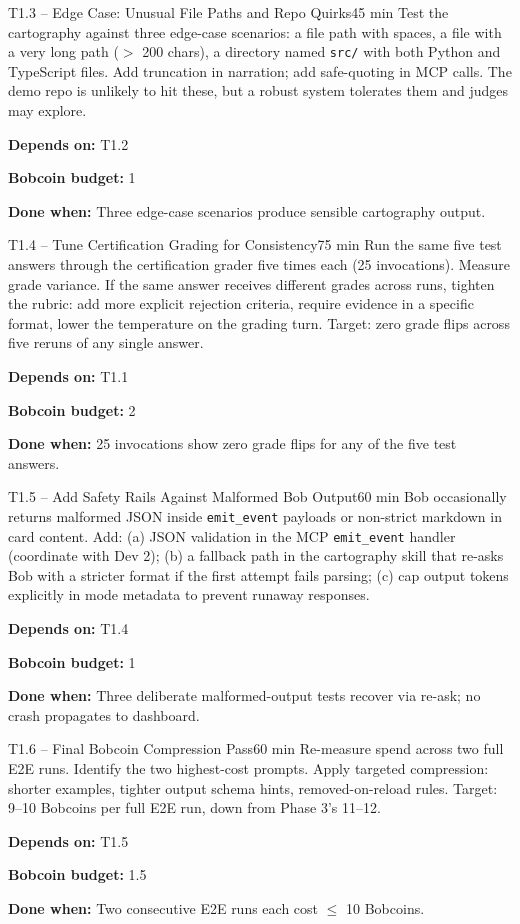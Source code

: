 \documentclass[11pt,letterpaper]{article}
\newcommand{\acceptance}[1]{\par\smallskip\textcolor{ibmgreen}{\textbf{Done when:}} #1}
\newcommand{\depends}[1]{\par\smallskip\textcolor{ibmorange}{\textbf{Depends on:}} #1}
\newcommand{\bobcost}[1]{\par\smallskip\textcolor{ibmaccent}{\textbf{Bobcoin budget:}} #1}
\begin{document}
\begin{task}{T1.3 -- Edge Case: Unusual File Paths and Repo Quirks}{45 min}
Test the cartography against three edge-case scenarios: a file path with spaces, a file with a very long path ($>$ 200 chars), a directory named \texttt{src/} with both Python and TypeScript files. Add truncation in narration; add safe-quoting in MCP calls. The demo repo is unlikely to hit these, but a robust system tolerates them and judges may explore.
\depends{T1.2}
\bobcost{1}
\acceptance{Three edge-case scenarios produce sensible cartography output.}
\end{task}

\begin{task}{T1.4 -- Tune Certification Grading for Consistency}{75 min}
Run the same five test answers through the certification grader five times each (25 invocations). Measure grade variance. If the same answer receives different grades across runs, tighten the rubric: add more explicit rejection criteria, require evidence in a specific format, lower the temperature on the grading turn. Target: zero grade flips across five reruns of any single answer.
\depends{T1.1}
\bobcost{2}
\acceptance{25 invocations show zero grade flips for any of the five test answers.}
\end{task}

\begin{task}{T1.5 -- Add Safety Rails Against Malformed Bob Output}{60 min}
Bob occasionally returns malformed JSON inside \texttt{emit\_event} payloads or non-strict markdown in card content. Add: (a) JSON validation in the MCP \texttt{emit\_event} handler (coordinate with Dev 2); (b) a fallback path in the cartography skill that re-asks Bob with a stricter format if the first attempt fails parsing; (c) cap output tokens explicitly in mode metadata to prevent runaway responses.
\depends{T1.4}
\bobcost{1}
\acceptance{Three deliberate malformed-output tests recover via re-ask; no crash propagates to dashboard.}
\end{task}

\begin{task}{T1.6 -- Final Bobcoin Compression Pass}{60 min}
Re-measure spend across two full E2E runs. Identify the two highest-cost prompts. Apply targeted compression: shorter examples, tighter output schema hints, removed-on-reload rules. Target: 9--10 Bobcoins per full E2E run, down from Phase 3's 11--12.
\depends{T1.5}
\bobcost{1.5}
\acceptance{Two consecutive E2E runs each cost $\leq$ 10 Bobcoins.}
\end{task}
\end{document}
